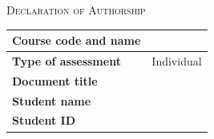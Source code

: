 
\thispagestyle{plain} %

\begin{center} 
	\textsc{Declaration of Authorship} 
\end{center}


\begin{center} 
	\begin{tabular}{|p{}|p{}|}
		\hline
		\textbf{Course code and name} & \docCourse \\
		\hline
		\textbf{Type of assessment} & Individual \\
		\hline
		\textbf{Document title} & \docTitle \\
		\hline
		\textbf{Student name} & \docAuthor \\
		\hline
		\textbf{Student ID} & \docAuthorID \\
		\hline
	\end{tabular}
\end{center}

\bigskip

